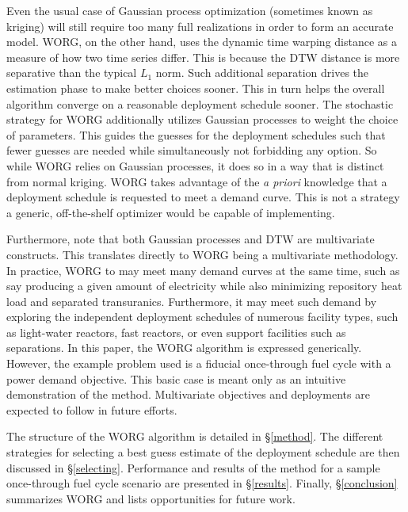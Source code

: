 Even the usual case of
Gaussian process optimization (sometimes known as kriging)
\cite{osborne2009gaussian,simpson2001kriging} will still
require too many full realizations in order to form an accurate model.
WORG, on the other hand, uses the dynamic time warping distance as a
measure of how two time series differ. This is because the DTW distance is
more separative than the typical
$L_1$ norm. Such additional separation drives the estimation phase to make
better choices
sooner. This in turn helps the overall algorithm converge on a reasonable
deployment schedule sooner.
The stochastic strategy for WORG additionally utilizes Gaussian processes to
weight the choice of parameters. This guides the guesses for the deployment
schedules such that fewer guesses are needed while simultaneously
not forbidding
any option.  So while WORG relies on Gaussian processes, it does so in a way
that is distinct from normal kriging. WORG
takes advantage of the \emph{a priori} knowledge that a deployment
schedule is requested to meet a demand curve. This is not a strategy a
generic, off-the-shelf optimizer would be capable of implementing.

Furthermore, note that both Gaussian processes and
DTW are multivariate constructs. This translates directly to WORG being
a multivariate methodology. In practice, WORG to may meet many
demand curves at the same time, such as say producing a given amount of
electricity while also minimizing repository heat load and separated
transuranics. Furthermore, it may meet such demand by exploring the
independent deployment schedules of numerous facility types, such as
light-water reactors, fast reactors, or even support facilities such as
separations. In this paper, the WORG algorithm is expressed generically.
However, the example problem used is a fiducial once-through fuel cycle
with a power demand objective. This basic case is meant only as an
intuitive demonstration of the method. Multivariate objectives and deployments
are expected to follow in future efforts.

The structure of the WORG algorithm is detailed in \S\ref{method}.
The different strategies for selecting a best guess estimate of the
deployment schedule are then discussed in \S\ref{selecting}. Performance
and results of the method for a sample once-through fuel cycle scenario
are presented in \S\ref{results}. Finally, \S\ref{conclusion} summarizes
WORG and lists opportunities for future work.
